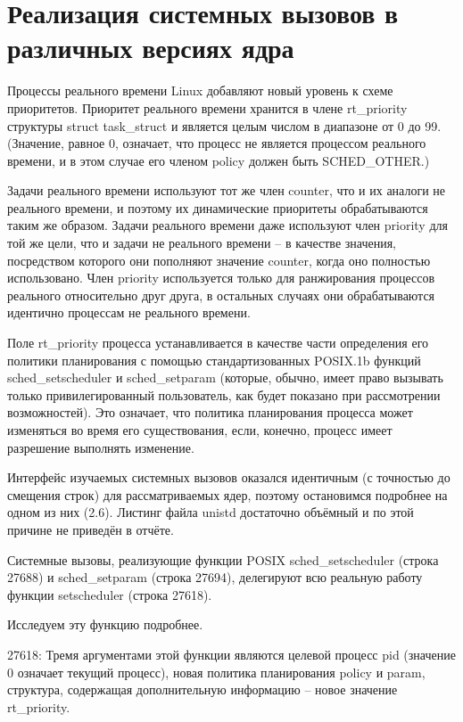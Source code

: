 \newpage
\section{Реализация системных вызовов в различных версиях ядра}

Процессы реального времени Linux добавляют новый уровень к схеме приоритетов. Приоритет реального времени хранится в члене rt\_priority структуры struct task\_struct и является целым числом в диапазоне от 0 до 99. (Значение, равное 0, означает, что процесс не является процессом реального времени, и в этом случае его членом policy должен быть SCHED\_OTHER.)

Задачи реального времени используют тот же член counter, что и их аналоги не реального времени, и поэтому их динамические приоритеты обрабатываются таким же образом. Задачи реального времени даже используют член priority для той же цели, что и задачи не реального времени -- в качестве значения, посредством которого они пополняют значение counter, когда оно полностью использовано. Член priority используется только для ранжирования процессов реального относительно друг друга, в остальных случаях они обрабатываются идентично процессам не реального времени.

Поле rt\_priority процесса устанавливается в качестве части определения его политики планирования с помощью стандартизованных POSIX.1b функций sched\_setscheduler и sched\_setparam (которые, обычно, имеет право вызывать только привилегированный пользователь, как будет показано при рассмотрении возможностей). Это означает, что политика планирования процесса может изменяться во время его существования, если, конечно, процесс имеет разрешение выполнять изменение.

Интерфейс изучаемых системных вызовов оказался идентичным (с точностью до смещения строк) для рассматриваемых ядер, поэтому остановимся подробнее на одном из них (2.6). Листинг файла unistd достаточно объёмный и по этой причине не приведён в отчёте.

Системные вызовы, реализующие функции POSIX sched\_setscheduler (строка 27688) и sched\_setparam (строка 27694), делегируют всю реальную работу функции setscheduler (строка 27618).

Исследуем эту функцию подробнее.

27618: Тремя аргументами этой функции являются целевой процесс pid (значение 0 означает текущий процесс), новая политика планирования policy и param, структура, содержащая дополнительную информацию -- новое значение rt\_priority.

